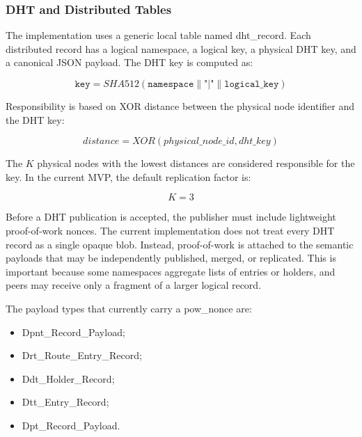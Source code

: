 \documentclass[12pt,a4paper]{article}
\newcommand{\codebreak}[1]{{\footnotesize\ttfamily #1}}
\begin{document}
\subsubsection{DHT and Distributed Tables}
\label{subsec:dht-implementation}

The implementation uses a generic local table named \codebreak{dht\_\allowbreak{}record}. Each distributed record has a logical namespace, a logical key, a physical DHT key, and a canonical JSON payload. The DHT key is computed as:

\begin{equation}
    \texttt{key} = SHA512(\texttt{namespace} \parallel \texttt{"|"} \parallel \texttt{logical\_key})
\end{equation}

Responsibility is based on XOR distance between the physical node identifier and the DHT key:

\begin{equation}
    distance = XOR(physical\_node\_id, dht\_key)
\end{equation}

The $K$ physical nodes with the lowest distances are considered responsible for the key. In the current MVP, the default replication factor is:

\begin{equation}
    K = 3
\end{equation}

Before a DHT publication is accepted, the publisher must include lightweight proof-of-work nonces. The current implementation does not treat every DHT record as a single opaque blob. Instead, proof-of-work is attached to the semantic payloads that may be independently published, merged, or replicated. This is important because some namespaces aggregate lists of entries or holders, and peers may receive only a fragment of a larger logical record.

The payload types that currently carry a \codebreak{pow\_\allowbreak{}nonce} are:

\begin{itemize}
    \item \codebreak{Dpnt\_\allowbreak{}Record\_\allowbreak{}Payload};
    \item \codebreak{Drt\_\allowbreak{}Route\_\allowbreak{}Entry\_\allowbreak{}Record};
    \item \codebreak{Ddt\_\allowbreak{}Holder\_\allowbreak{}Record};
    \item \codebreak{Dtt\_\allowbreak{}Entry\_\allowbreak{}Record};
    \item \codebreak{Dpt\_\allowbreak{}Record\_\allowbreak{}Payload}.
\end{itemize}
\end{document}
